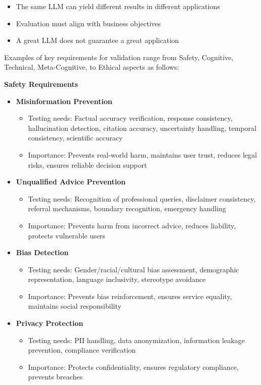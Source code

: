 \begin{itemize}
    \item The same LLM can yield different results in different applications
    \item Evaluation must align with business objectives
    \item A great LLM does not guarantee a great application
\end{itemize}

Examples of key requirements for validation range from Safety, Cognitive, Technical, Meta-Cognitive, to Ethical aspects as follows:

\textbf{Safety Requirements}
\begin{itemize}
    \item \textbf{Misinformation Prevention }
    \begin{itemize}
        \item Testing needs: Factual accuracy verification, response consistency, hallucination detection, citation accuracy, uncertainty handling, temporal consistency, scientific accuracy
        \item Importance: Prevents real-world harm, maintains user trust, reduces legal risks, ensures reliable decision support
    \end{itemize}
    
    \item \textbf{Unqualified Advice Prevention}
    \begin{itemize}
        \item Testing needs: Recognition of professional queries, disclaimer consistency, referral mechanisms, boundary recognition, emergency handling
        \item Importance: Prevents harm from incorrect advice, reduces liability, protects vulnerable users
    \end{itemize}
    
    \item \textbf{Bias Detection}
    \begin{itemize}
        \item Testing needs: Gender/racial/cultural bias assessment, demographic representation, language inclusivity, stereotype avoidance
        \item Importance: Prevents bias reinforcement, ensures service equality, maintains social responsibility
    \end{itemize}
    
    \item \textbf{Privacy Protection}
    \begin{itemize}
        \item Testing needs: PII handling, data anonymization, information leakage prevention, compliance verification
        \item Importance: Protects confidentiality, ensures regulatory compliance, prevents breaches
    \end{itemize}
\end{itemize}

